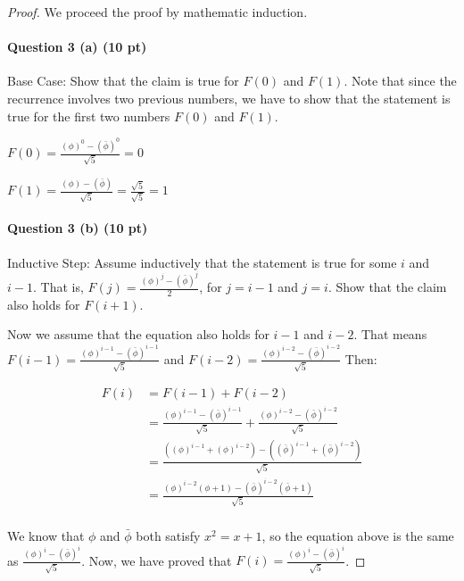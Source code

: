 \documentclass[11pt,letterpaper]{article}
\begin{document}
\begin{proof}

We proceed the proof by mathematic induction.

\medskip

\paragraph*{Question 3 (a) (10 pt)} Base Case: Show that the claim is true for $F(0)$ and $F(1)$. Note that since the recurrence involves two previous numbers, we have to show that the statement is true for the first two numbers $F(0)$ and $F(1)$. 


$F(0) = \frac{(\phi)^0 - (\bar{\phi})^0}{\sqrt{5}} = 0$

$F(1) = \frac{(\phi) - (\bar{\phi})}{\sqrt{5}} = \frac{\sqrt{5}}{\sqrt{5}} = 1$

\bigskip\bigskip

\paragraph*{Question 3 (b) (10 pt)} Inductive Step: Assume inductively that the statement is true for some $i$ and $i-1$. That is, $F(j) = \frac{(\phi)^j - (\bar{\phi})^j}{2}$, for $j=i-1$ and $j=i$. Show that the claim also holds for $F(i+1)$.


Now we assume that the equation also holds for $i - 1$ and $i - 2$.
That means $F(i - 1) = \frac{(\phi)^{i - 1} - (\bar{\phi})^{i - 1}}{\sqrt{5}}$ and $F(i - 2) = \frac{(\phi)^{i - 2} - (\bar{\phi})^{i - 2}}{\sqrt{5}}$
Then:

\begin{align}
    F(i)
    &= F(i - 1) + F(i - 2) \\
    &= \frac{(\phi)^{i - 1} - (\bar{\phi})^{i - 1}}{\sqrt{5}} + \frac{(\phi)^{i - 2} - (\bar{\phi})^{i - 2}}{\sqrt{5}}\\
    &= \frac{((\phi)^{i - 1} + (\phi)^{i - 2}) - ((\bar{\phi})^{i - 1} + (\bar{\phi})^{i - 2})}{\sqrt{5}} \\
    &= \frac{(\phi)^{i - 2}(\phi + 1) - (\bar{\phi})^{i - 2}(\bar{\phi} + 1)}{\sqrt{5}} \\
\end{align}

We know that $\phi$ and $\bar{\phi}$ both satisfy $x^2 = x + 1$, so the equation above is the same as $\frac{(\phi)^i - (\bar{\phi})^i}{\sqrt{5}}$.
Now, we have proved that $F(i) = \frac{(\phi)^i - (\bar{\phi})^i}{\sqrt{5}}$.

\bigskip\bigskip

\end{proof}
\end{document}
